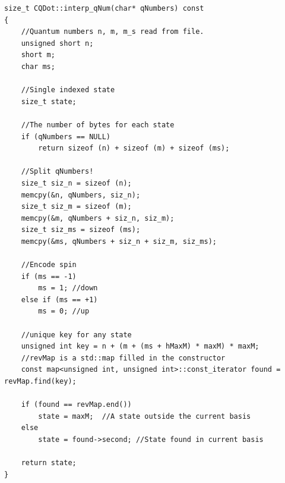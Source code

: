 \begin{lstlisting}[float,label={lst:qDots:interp_qNum},caption={Implementation of `interp\_qNum' in `CQDot'.}]
size_t CQDot::interp_qNum(char* qNumbers) const
{
    //Quantum numbers n, m, m_s read from file.
    unsigned short n;
    short m;
    char ms;
    
    //Single indexed state
    size_t state;

    //The number of bytes for each state
    if (qNumbers == NULL)
        return sizeof (n) + sizeof (m) + sizeof (ms);

    //Split qNumbers!
    size_t siz_n = sizeof (n);
    memcpy(&n, qNumbers, siz_n);
    size_t siz_m = sizeof (m);
    memcpy(&m, qNumbers + siz_n, siz_m);
    size_t siz_ms = sizeof (ms);
    memcpy(&ms, qNumbers + siz_n + siz_m, siz_ms);

    //Encode spin
    if (ms == -1) 
        ms = 1; //down
    else if (ms == +1)
        ms = 0; //up
    
    //unique key for any state
    unsigned int key = n + (m + (ms + hMaxM) * maxM) * maxM;
    //revMap is a std::map filled in the constructor
    const map<unsigned int, unsigned int>::const_iterator found = revMap.find(key);
    
    if (found == revMap.end())
        state = maxM;  //A state outside the current basis
    else
        state = found->second; //State found in current basis

    return state;
}
\end{lstlisting}


